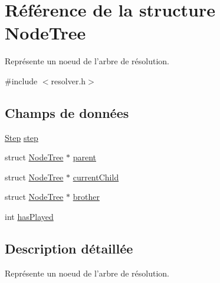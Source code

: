 \hypertarget{struct_node_tree}{\section{Référence de la structure Node\-Tree}
\label{struct_node_tree}
}


Représente un noeud de l'arbre de résolution.  




{\ttfamily \#include $<$resolver.\-h$>$}

\subsection*{Champs de données}
\begin{DoxyCompactItemize}
\item 
\hyperlink{struct_step}{Step} \hyperlink{struct_node_tree_ae5f3bfeb7e3cb5c8bc769d5504ebeeae}{step}
\item 
struct \hyperlink{struct_node_tree}{Node\-Tree} $\ast$ \hyperlink{struct_node_tree_a457d913bff1ebc8671c1eca1c9d5fc03}{parent}
\item 
struct \hyperlink{struct_node_tree}{Node\-Tree} $\ast$ \hyperlink{struct_node_tree_a171a4a950363163c8a809722b874ace5}{current\-Child}
\item 
struct \hyperlink{struct_node_tree}{Node\-Tree} $\ast$ \hyperlink{struct_node_tree_a5ef305fb016dbd90107261284be7f64d}{brother}
\item 
int \hyperlink{struct_node_tree_aeb3531905942c7123621cd828297f99a}{has\-Played}
\end{DoxyCompactItemize}


\subsection{Description détaillée}
Représente un noeud de l'arbre de résolution. 

